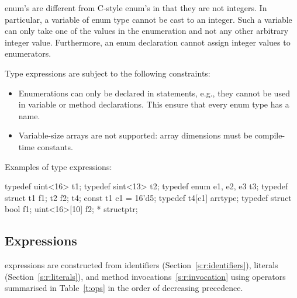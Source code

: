 \tsl enum's are different from C-style enum's in that they are not 
integers.  In particular, a variable of enum type cannot be cast 
to an integer.  Such a variable can only take one of the values in 
the enumeration and not any other arbitrary integer value.  
Furthermore, an enum declaration cannot assign integer values to 
enumerators.

Type expressions are subject to the following constraints:
\begin{itemize}
    \item Enumerations can only be declared in 
        statements, e.g., they cannot be used in variable or 
        method declarations.  This ensure that every enum type has 
        a name.
    \item Variable-size arrays are not supported: array dimensions 
        must be compile-time constants.
\end{itemize}

Examples of type expressions:

\begin{tsllisting2}
typedef uint<16> t1;
typedef sint<13> t2;
typedef enum {e1, e2, e3} t3;
typedef struct {t1 f1; t2 f2;} t4;
const t1 c1 = 16'd5;
typedef t4[c1] arrtype;
typedef struct {bool f1; uint<16>[10] f2;} * structptr;
\end{tsllisting2}

\subsection{Expressions}

\tsl expressions are constructed from identifiers 
(Section~\ref{s:r:identifiers}), literals
(Section~\ref{s:r:literals}), and method 
invocations~\ref{s:r:invocation} using operators summarised in 
Table~\ref{t:ops} in the order of decreasing precedence.

